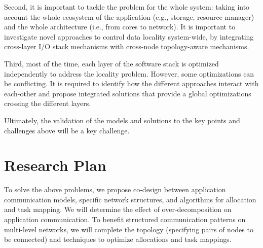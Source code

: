 Second, it is important to tackle the problem for the whole system: taking into account
the whole ecosystem of the application (e.g., storage, resource manager) and the
whole architecture (i.e., from cores to network). It is important to investigate
novel approaches to control data locality system-wide, by integrating
cross-layer I/O stack mechanisms  with cross-node topology-aware mechanisms. 

Third, most of the time, each layer of the software stack is optimized
independently to address the locality problem. However, some optimizations can
be conflicting. It is required to identify how the different approaches interact
with each-other and propose integrated solutions that provide a global
optimizations crossing the different layers.

Ultimately, the validation of the models and solutions to the key points and challenges above 
will be a key challenge.

\section{Research Plan}

To solve the above problems, we propose co-design between application 
communication models, specific network structures, and algorithms for 
allocation and task mapping.
We will determine the effect of over-decomposition on application 
communication.
To benefit structured communication patterns on multi-level networks, we will 
complete the topology (specifying pairs of nodes to be connected) and 
techniques to optimize allocations and task mappings.
